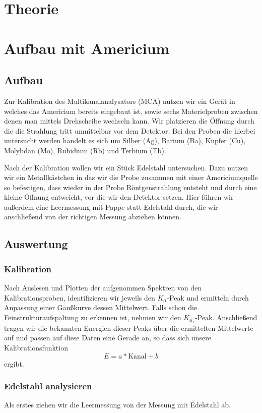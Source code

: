 \documentclass[a4paper,14pt]{article}
\begin{document}
\section{Theorie}

\section{Aufbau mit Americium}
\subsection{Aufbau}
Zur Kalibration des Multikanalanalysators (MCA) nutzen wir ein Gerät in welches das Americium bereits eingebaut ist, sowie sechs Materielproben zwischen denen man mittels Drehscheibe wechseln kann. Wir platzieren die Öffnung durch die die Strahlung tritt unmittelbar vor dem Detektor.
Bei den Proben die hierbei untersucht werden handelt es sich um Silber (Ag), Barium (Ba), Kupfer (Cu), Molybdän (Mo), Rubidium (Rb) und Terbium (Tb).

Nach der Kalibration wollen wir ein Stück Edelstahl untersuchen. Dazu nutzen wir ein Metallkästchen in das wir die Probe zusammen mit einer Americiumquelle so befestigen, dass wieder in der Probe Röntgenstrahlung entsteht und durch eine kleine Öffnung entweicht, vor die wir den Detektor setzen. Hier führen wir außerdem eine Leermessung mit Pappe statt Edelstahl durch, die wir anschließend von der richtigen Messung abziehen können.

\subsection{Auswertung}
\subsubsection{Kalibration}
Nach Auslesen und Plotten der aufgenommen Spektren von den Kalibrationsproben, identifizieren wir jeweils den $K_\alpha$-Peak und ermitteln durch Anpassung einer Gaußkurve dessen Mittelwert. Falls schon die Feinstrukturaufspaltung zu erkennen ist, nehmen wir den $K_{\alpha_1}$-Peak. Anschließend tragen wir die bekannten Energien dieser Peaks über die ermittelten Mittelwerte auf und passen auf diese Daten eine Gerade an, so dass sich unsere Kalibrationsfunktion
\begin{equation}
	E = a * \mathrm{Kanal} + b
\end{equation}
ergibt.

\subsubsection{Edelstahl analysieren}
Als erstes ziehen wir die Leermessung von der Messung mit Edelstahl ab. 
\end{document}

